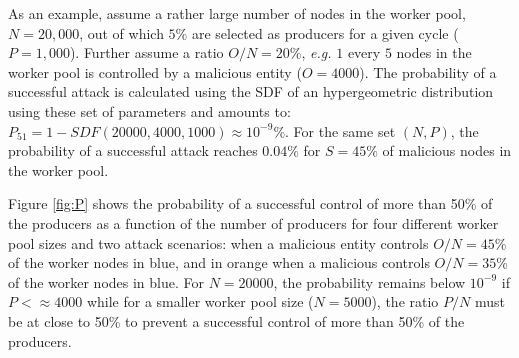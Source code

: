 As an example, assume a rather large number of nodes in the worker pool, $N = 20,000$, out of which $5\%$ are selected as producers for a given cycle ($P = 1,000$). 
Further assume a ratio $O/N=20\%$, \textit{e.g.} $1$ every $5$ nodes in the worker pool is controlled by a malicious entity ($O=4000$). The probability of a successful attack is calculated using the SDF of an hypergeometric distribution using these set of parameters and amounts to: $P_51 = 1-SDF(20000,4000,1000) \approx 10^{-9}\%$. For the same set $(N,P)$, the probability of a successful attack reaches $0.04\%$ for $S=45\%$ of malicious nodes in the worker pool. 

Figure \ref{fig:P} shows the probability of a successful control of more than 50\% of the producers as a function of the number of producers for four different worker pool sizes and two attack scenarios: when a malicious entity controls $O/N = 45\%$ of the worker nodes in blue, and in orange when a malicious controls $O/N = 35\%$ of the worker nodes in blue. For $N=20000$, the probability remains below $10^{-9}$ if $P < \approx 4000$ while for a smaller worker pool size ($N=5000$), the ratio $P/N$ must be at close to 50\% to prevent a successful control of more than 50\% of the producers. 

